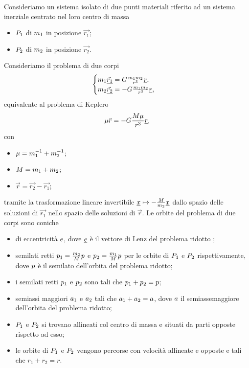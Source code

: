 \begin{Theorem}
	Consideriamo un sistema isolato di due punti materiali riferito ad un
  sistema inerziale centrato nel loro centro di massa
	\begin{itemize}
		\item $P_1$ di $m_1$ in posizione $\vec{r_1}$;
		\item $P_2$ di $m_2$ in posizione $\vec{r_2}$.
	\end{itemize}
	Consideriamo il problema di due corpi
	\[
		\begin{cases}
			m_1 \ddot{\underline{r_1}}
        = G \frac{m_1m_2}{r^3}\underline{r},\\
			m_2 \ddot{\underline{r_2}}
        = - G \frac{m_1m_2}{r^3}\underline{r},
		\end{cases}
	\]
	equivalente al problema di Keplero
	\[
		\mu \ddot{r}
      = - G \frac{M\mu}{r^3}\underline{r},
	\]
	con
	\begin{itemize}
		\item $\mu = m_1^{-1} + m_2^{-1}$;
		\item $M = m_1 + m_2$;
		\item $\vec{r} = \vec{r_2} - \vec{r_1}$;
	\end{itemize}
	tramite la trasformazione lineare invertibile
$\underline{x} \mapsto - \frac{M}{m_2} \underline{x}$ dallo spazio
delle soluzioni di $\vec{r_1}$ nello spazio delle soluzioni di
$\vec{r}$.
	Le orbite del problema di due corpi sono coniche
	\begin{itemize}
		\item di eccentricit\`a $e$, dove $\underline{e}$ \`e
      il vettore di Lenz del problema ridotto ;
		\item semilati retti $p_1 =
      \frac{m_2}{M} p$ e
      $p_2 = \frac{m_1}{M} p$
      per le orbite di $P_1$ e $P_2$ rispettivamente,
      dove $p$ \`e il semilato dell'orbita del problema
      ridotto;
		\item i semilati retti $p_1$ e $p_2$
      sono tali che $p_1 + p_2
      = p$;
		\item semiassi maggiori $a_1$ e $a_2$ tali
      che $a_1 + a_2 = a$, dove
      $a$ il semiassemaggiore dell'orbita del problema
      ridotto;
		\item $P_1$ e $P_2$ si trovano allineati col
      centro di massa e situati da parti opposte rispetto ad esso;
		\item le orbite di $P_1$ e $P_2$ vengono percorse
      con velocit\`a allineate e opposte e tali che
      $\dot{r_1} + \dot{r_2} = \dot{r}$.
	\end{itemize}
\end{Theorem}
